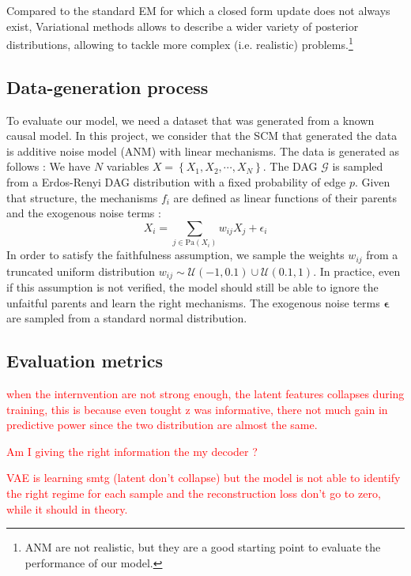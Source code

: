 \documentclass{article}
\newcommand\todo[1]{\textcolor{red}{#1}}
\begin{document}
Compared to the standard EM for which a closed form update does not always exist, Variational methods allows to describe a wider variety of posterior distributions, allowing to tackle more complex (i.e. realistic) problems.\footnote{ANM are not realistic, but they are a good starting point to evaluate the performance of our model.}


\subsection{Data-generation process}

To evaluate our model, we need a dataset that was generated from a known causal model. In this project, we consider that the SCM that generated the data is additive noise model (ANM) with linear mechanisms. The data is generated as follows : We have $N$ variables $X = \left\{ X_1, X_2, \cdots, X_N \right\}$.  The DAG $\mathcal{G}$ is sampled from a Erdos-Renyi DAG distribution with a fixed probability of edge $p$. Given that structure, the mechanisms $f_i$ are defined as linear functions of their parents and the exogenous noise terms :
\begin{equation}
    X_i = \sum_{j \in \text{Pa}(X_i)} w_{ij} X_j + \epsilon_i
\end{equation}
In order to satisfy the faithfulness assumption, we sample the weights $w_{ij}$ from a truncated uniform distribution $w_{ij} \sim \mathcal{U}(-1,0.1) \cup \mathcal{U}(0.1,1)$. In practice, even if this assumption is not verified, the model should still be able to ignore the unfaitful parents and learn the right mechanisms. The exogenous noise terms $\boldsymbol{\epsilon}$ are sampled from a standard normal distribution.

\subsection{Evaluation metrics}
\todo{when the internvention are not strong enough, the latent features collapses during training, this is because even tought z was informative, there not much gain in predictive power since the two distribution are almost the same.}

\todo{Am I giving the right information the my decoder ?}

\todo{VAE is learning smtg (latent don't collapse) but the model is not able to identify the right regime for each sample and the reconstruction loss don't go to zero, while it should in theory.}
\end{document}
